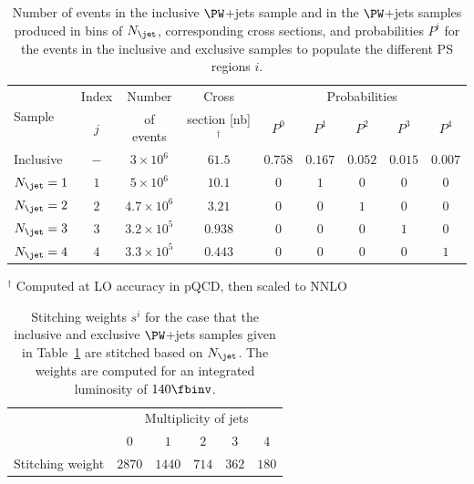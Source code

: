 \begin{table}[h!]
\begin{center}
\def\arraystretch{1.3}
\begin{tabular}{l|c|c|c|ccccc}
\multirow{2}{20mm}{Sample} & Index & Number    & Cross                    & \multicolumn{5}{c}{Probabilities}               \\
                           & $j$   & of events & section [nb]$^{\dagger}$ & $P^{0}$ & $P^{1}$ & $P^{2}$ & $P^{3}$ & $P^{4}$ \\
\hline
Inclusive                  & $-$   & $3 \times 10^{6}$ & $61.5$ & $0.758$ & $0.167$ & $0.052$ & $0.015$ & $0.007$ \\
$N_{\jet} = 1$             & $1$   & $5 \times 10^{6}$   & $10.1$  & $0$     & $1$     & $0$     & $0$     & $0$  \\
$N_{\jet} = 2$             & $2$   & $4.7 \times 10^{6}$ & $3.21$  & $0$     & $0$     & $1$     & $0$     & $0$  \\
$N_{\jet} = 3$             & $3$   & $3.2 \times 10^{5}$ & $0.938$ & $0$     & $0$     & $0$     & $1$     & $0$  \\
$N_{\jet} = 4$             & $4$   & $3.3 \times 10^{5}$ & $0.443$ & $0$     & $0$     & $0$     & $0$     & $1$  \\
\end{tabular}
\end{center}
$^{\dagger}$ Computed at LO accuracy in pQCD, then scaled to NNLO
\caption{
  Number of events in the inclusive $\PW$+jets sample and in the $\PW$+jets samples produced in bins of $N_{\jet}$,
  corresponding cross sections,
  and probabilities $P^{i}$ for the events in the inclusive and exclusive samples to populate the different PS regions $i$.
}
\label{tab:samples_and_probabilities_WJets_vs_Njet}
\end{table}

\begin{table}[h!]
\begin{center}
\begin{tabular}{l|ccccc}
 & \multicolumn{5}{c}{Multiplicity of jets} \\
 & $0$ & $1$ & $2$ & $3$ & $4$ \\
\hline
Stitching weight & $2870$ & $1440$ & $714$ & $362$ & $180$ \\
\end{tabular}
\end{center}
\caption{
  Stitching weights $s^{i}$ for the case that the inclusive and exclusive $\PW$+jets samples 
  given in Table~\ref{tab:samples_and_probabilities_WJets_vs_Njet}
  are stitched based on $N_{\jet}$.
  The weights are computed for an integrated luminosity of $140\fbinv$.
}
\label{tab:weights_WJets_vs_Njet}
\end{table}

